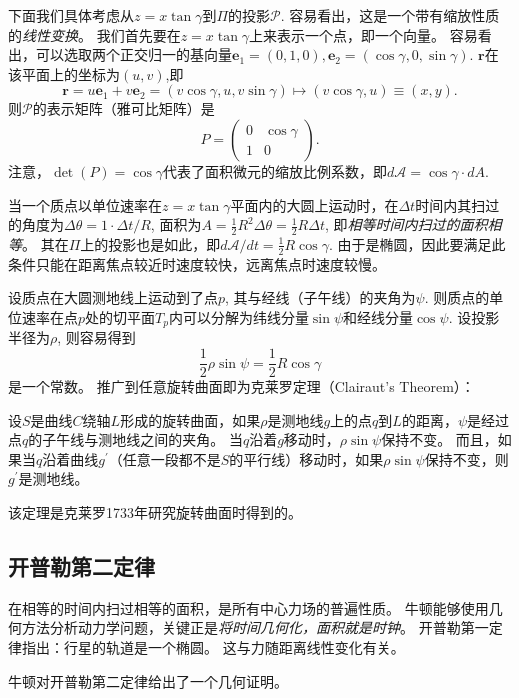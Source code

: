 \documentclass{article}
\begin{document}
下面我们具体考虑从$z=x\tan\gamma$到$\Pi$的投影$\mathcal{P}$.
容易看出，这是一个带有缩放性质的\emph{线性变换}。
我们首先要在$z=x\tan\gamma$上来表示一个点，即一个向量。
容易看出，可以选取两个正交归一的基向量$\mathbf{e}_{1}=(0, 1, 0),\mathbf{e}_{2}=(\cos\gamma, 0, \sin\gamma)$.
$\mathbf{r}$在该平面上的坐标为$(u, v)$,即
\begin{equation*}
    \mathbf{r}
    =u\mathbf{e}_{1}+v\mathbf{e}_{2}
    =(v\cos\gamma, u, v\sin\gamma)
    \longmapsto
    (v\cos\gamma, u)
    \equiv(x, y).
\end{equation*}
则$\mathcal{P}$的表示矩阵（雅可比矩阵）是
\begin{equation*}
    P=
    \begin{pmatrix}
        0 & \cos\gamma \\
        1 & 0
    \end{pmatrix}.
\end{equation*}
注意，$\det(P)=\cos\gamma$代表了面积微元的缩放比例系数，即$d\mathcal{A}=\cos\gamma\cdot{dA}$.

当一个质点以单位速率在$z=x\tan\gamma$平面内的大圆上运动时，在$\Delta{t}$时间内其扫过的角度为$\Delta\theta=1\cdot\Delta{t}/R$, 面积为$A=\frac{1}{2}R^{2}\Delta\theta=\frac{1}{2}R\Delta{t}$, 即\emph{相等时间内扫过的面积相等}。
其在$\Pi$上的投影也是如此，即$d\mathcal{A}/dt=\frac{1}{2}R\cos\gamma$.
由于是椭圆，因此要满足此条件只能在距离焦点较近时速度较快，远离焦点时速度较慢。

设质点在大圆测地线上运动到了点$p$, 其与经线（子午线）的夹角为$\psi$.
则质点的单位速率在点$p$处的切平面$T_{p}$内可以分解为纬线分量$\sin\psi$和经线分量$\cos\psi$.
设投影半径为$\rho$, 则容易得到
\begin{equation*}
    \frac{1}{2}\rho\sin\psi
    =\frac{1}{2}R\cos\gamma
\end{equation*}
是一个常数。
推广到任意旋转曲面即为克莱罗定理（Clairaut’s Theorem）：
\begin{tcolorbox}[colback=white, arc=3mm, auto outer arc]
\begin{minipage}[c,t]{1.0\textwidth}
\kaishu
设$S$是曲线$C$绕轴$L$形成的旋转曲面，如果$\rho$是测地线$g$上的点$q$到$L$的距离，$\psi$是经过点$q$的子午线与测地线之间的夹角。
当$q$沿着$g$移动时，$\rho\sin\psi$保持不变。
而且，如果当$q$沿着曲线$g^{\prime}$（任意一段都不是$S$的平行线）移动时，如果$\rho\sin\psi$保持不变，则$g^{\prime}$是测地线。
\end{minipage}
\end{tcolorbox}
该定理是克莱罗1733年研究旋转曲面时得到的。

\subsection{开普勒第二定律}

在相等的时间内扫过相等的面积，是所有中心力场的普遍性质。
牛顿能够使用几何方法分析动力学问题，关键正是\emph{将时间几何化，面积就是时钟}。
开普勒第一定律指出：行星的轨道是一个椭圆。
这与力随距离线性变化有关。

牛顿对开普勒第二定律给出了一个几何证明。

%
%
\end{document}
